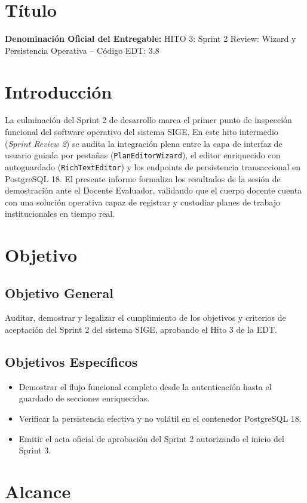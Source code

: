 \documentclass[12pt,a4paper]{article}
\begin{document}
\section{Título}
\textbf{Denominación Oficial del Entregable:} HITO 3: Sprint 2 Review: Wizard y Persistencia Operativa -- Código EDT: 3.8

\section{Introducción}
La culminación del Sprint 2 de desarrollo marca el primer punto de inspección funcional del software operativo del sistema SIGE. En este hito intermedio (\textit{Sprint Review 2}) se audita la integración plena entre la capa de interfaz de usuario guiada por pestañas (\texttt{PlanEditorWizard}), el editor enriquecido con autoguardado (\texttt{RichTextEditor}) y los endpoints de persistencia transaccional en PostgreSQL 18. El presente informe formaliza los resultados de la sesión de demostración ante el Docente Evaluador, validando que el cuerpo docente cuenta con una solución operativa capaz de registrar y custodiar planes de trabajo institucionales en tiempo real.

\section{Objetivo}
\subsection{Objetivo General}
Auditar, demostrar y legalizar el cumplimiento de los objetivos y criterios de aceptación del Sprint 2 del sistema SIGE, aprobando el Hito 3 de la EDT.
\subsection{Objetivos Específicos}
\begin{itemize}[leftmargin=1.5em, itemsep=2pt]
    \item Demostrar el flujo funcional completo desde la autenticación hasta el guardado de secciones enriquecidas.
    \item Verificar la persistencia efectiva y no volátil en el contenedor PostgreSQL 18.
    \item Emitir el acta oficial de aprobación del Sprint 2 autorizando el inicio del Sprint 3.
\end{itemize}

\section{Alcance}
\end{document}
